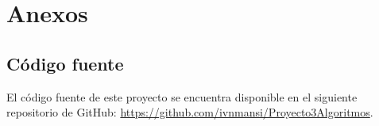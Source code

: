 \chapter{Anexos}
\section{Código fuente}
El código fuente de este proyecto se encuentra disponible en el siguiente repositorio de GitHub: \url{https://github.com/ivnmansi/Proyecto3Algoritmos}.